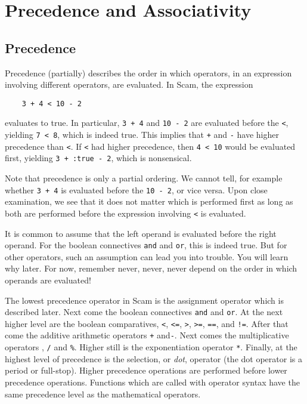 \chapter{Precedence and Associativity}
\label{PrecedenceAndAssociativity}

\section{Precedence}

Precedence (partially) describes the order in which operators, in
an expression involving different operators, are evaluated. In Scam,
the expression

\begin{verbatim}
    3 + 4 < 10 - 2
\end{verbatim}

evaluates to true. In particular, {\tt 3 + 4} and {\tt 10 - 2}
are evaluated before the {\tt <}, yielding {\tt 7 < 8},
which is indeed true. This implies that {\tt +} and
{\tt -} have higher precedence than {\tt <}. If
{\tt <} had higher precedence, then {\tt 4 < 10}
would be evaluated first, yielding {\tt 3 + :true - 2}, which
is nonsensical.

Note that precedence is only a partial ordering. We cannot tell, for
example whether {\tt 3 + 4} is evaluated before the {\tt 10 - 2},
or vice versa. Upon close examination, we see that it does not
matter which is performed first as long as both are performed before
the expression involving {\tt <} is evaluated.

It is common to
assume that the left operand is evaluated before the right operand. For
the {\sc boolean} connectives {\tt and} and {\tt or},
this is indeed true. But for other operators, such an assumption
can lead you into trouble. You will learn why later. For now, remember
never, never, never depend on the order in which operands are evaluated!

The lowest precedence operator in Scam is the assignment operator which
is described later. Next come the {\sc boolean} connectives {\tt and}
and {\tt or}.  At the next higher level are the {\sc boolean}
comparatives, {\tt <}, {\tt <=}, {\tt >},
{\tt >=}, {\tt ==}, and {\tt !=}.  After
that come the additive arithmetic operators {\tt +}
and{\tt -}. Next comes the
multiplicative operators
{\tt *}, {\tt /} and {\tt \%}.
Higher still is the exponentiation operator {\tt **}.
Finally, at the highest level of precedence is the selection,
or {\it dot}, operator (the dot operator is a period or full-stop). Higher
precedence operations are performed before lower precedence operations.
Functions which are called with operator syntax have the same precedence
level as the mathematical operators.

